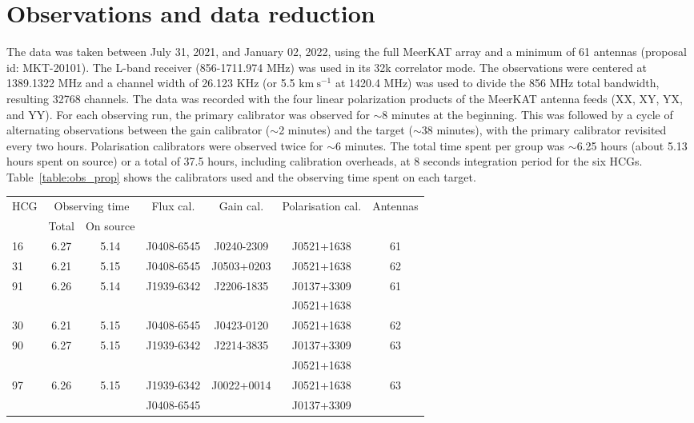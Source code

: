 \documentclass{aa}
\begin{document}
\section{Observations and data reduction}\label{observation}
The data was taken between July 31, 2021, and January 02, 2022, using the full MeerKAT array and a minimum of 61 antennas (proposal id: MKT-20101). 
The L-band receiver (856-1711.974 MHz) was used in its 32k correlator mode. The observations were centered at 1389.1322 MHz 
and a channel width of 26.123 KHz (or 5.5 $\mathrm{km~s^{-1}}$ at 1420.4 MHz) was used to divide the 856 MHz total bandwidth, 
resulting 32768 channels. The data was recorded with the four linear polarization products of the MeerKAT antenna feeds (XX, XY, YX, and YY). 
For each observing run, the primary calibrator was observed for $\sim$8 minutes at the beginning. This was followed by a cycle of alternating 
observations between the gain calibrator ($\sim$2 minutes) and the target ($\sim$38 minutes), with the primary calibrator revisited every two hours. 
Polarisation calibrators were observed twice for $\sim$6 minutes. The total time spent per group was $\sim$6.25 hours (about 5.13 hours spent on source) or a total of 37.5 hours, 
including calibration overheads, at 8 seconds integration period for the six HCGs. Table~\ref{table:obs_prop} shows the calibrators used and the observing time spent on each target. \\
\begin{table*}
\centering
\captionsetup{justification=centering}
\caption{\label{table:obs_prop}Observational properties}
\begin{tabular}{lcccccc}
\toprule \toprule
HCG & \multicolumn{2}{c}{Observing time} & Flux cal. & Gain cal. & Polarisation cal. & Antennas\\
 & Total & On source & &  & & \\
\midrule
16 & 6.27 & 5.14 & J0408-6545 & J0240-2309 & J0521+1638 & 61\\
31 & 6.21 & 5.15 & J0408-6545 & J0503+0203 & J0521+1638 & 62\\
\multirow{1}{*}{91} & 6.26 & 5.14 & J1939-6342 & J2206-1835 & J0137+3309 & 61\\
                    &      &      &           &             & J0521+1638 & \\
\midrule
30 & 6.21 & 5.15 & J0408-6545 & J0423-0120 & J0521+1638 & 62\\
\multirow{1}{*}{90} & 6.27 & 5.15 & J1939-6342 & J2214-3835 & J0137+3309 & 63\\
                    &      &      &           &             & J0521+1638 & \\
\multirow{1}{*}{97} & 6.26 & 5.15 & J1939-6342 & J0022+0014 & J0521+1638 & 63\\
                    &   &    & J0408-6545 &  & J0137+3309 & \\
\bottomrule
\end{tabular}
\end{table*}
\end{document}
